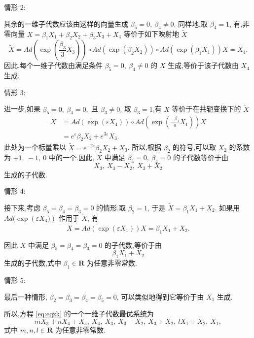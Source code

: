 情形 2:

其余的一维子代数应该由这样的向量生成 $\beta_5=0, ~\beta_4\neq 0$. 同样地,取 $\beta_4=1$, 有,非零向量 $X=\beta_{1}X_{1}+\beta_{2}X_{2}+\beta_{3}X_{3}+X_{4}$ 等价于如下映射地 $\widetilde{X}$
\begin{equation*}
	\widetilde{X}= Ad(\exp{(\frac{\beta_3}{3} X_3)})\circ Ad(\exp{(\beta_2 X_2)})\circ Ad(\exp{(\beta_1 X_1)}) X=X_{4}.
\end{equation*}
因此,每个一维子代数由满足条件 $\beta_5=0,~ \beta_4\neq 0$ 的 $X$ 生成,等价于该子代数由 $X_{4}$ 生成.

情形 3:

进一步,如果 $\beta_5=0,~\beta_4=0,$ 且 $\beta_3\neq 0$, 取 $\beta_3=1$,有 $X$ 等价于在共轭变换下的 $\widetilde{X}$
\begin{equation*}
\begin{aligned}
\widetilde{X}&=Ad(\exp(\varepsilon X_{4}))\circ Ad(\exp{(\frac{-\beta_1}{a} X_1)}) X\\
&=e^{\varepsilon}\beta_{2}X_{2}+e^{3\varepsilon}X_{3}.
\end{aligned}
\end{equation*}
此处为一个标量乘以 $\widetilde{X}=e^{-2\varepsilon}\beta_{2}X_{2}+X_{3}$. 所以,根据 $\beta_{2}$ 的符号,可以取 $X_{2}$ 的系数为 $+1,~-1,~0$ 中的一个.因此, $X$ 中满足 $\beta_5=0,~\beta_4=0$ 的子代数等价于由
\begin{equation*}
	X_{3}, ~X_{3}-X_{2}, ~X_{3}+X_{2}
\end{equation*}
生成的子代数.

情形 4:

接下来,考虑 $\beta_5=\beta_4=\beta_3=0$ 的情形.取 $\beta_2=1$, 于是 $\widetilde{X}=\beta_{1}X_{1}+X_{2}$. 如果用 $Ad(\exp({\varepsilon X_4)})$ 作用于 $\widetilde{X}$, 有
\begin{equation*}
	\widetilde{X}=Ad(\exp{(\varepsilon X_1)}) X=\beta_{1}X_{1}+X_{2}.
\end{equation*}

因此 $X$ 中满足 $\beta_5=\beta_4=\beta_3=0$ 的子代数,等价于由
\begin{equation*}
	\beta_{1}X_{1}+X_{2}
\end{equation*}
生成的子代数,式中 $\beta_{1} \in \mathbf{R}$ 为任意非零常数.

情形 5:

最后一种情形, $\beta_{2}=\beta_{3}=\beta_{4}=\beta_{5}=0$, 可以类似地得到它等价于由 $X_1$ 生成.

所以,方程 \eqref{eq:eqzk} 的一个一维子代数最优系统为
\begin{equation*}
	mX_{3}+nX_{4}+X_{5}, ~X_{4},~ X_{3}, ~X_{3}-X_{2},~ X_{3}+X_{2},~ lX_{1}+X_{2}, ~X_{1},
\end{equation*}
式中 $m,n,l\in \mathbf{R}$ 为任意非零常数.

